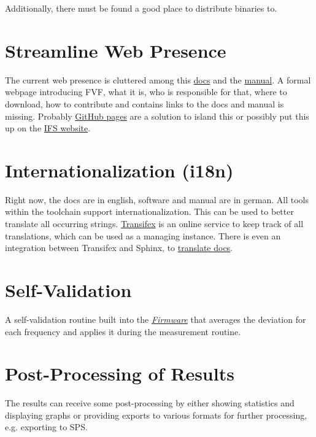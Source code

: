 Additionally, there must be found a good place to distribute binaries to.


\section{Streamline Web Presence}
\label{development/follow-ups:streamline-web-presence}
The current web presence is cluttered among this \href{https://fvf.readthedocs.org}{docs} and the \href{https://fvf-manual.readthedocs.org}{manual}. A formal webpage introducing FVF, what it is, who is responsible for that, where to download, how to contribute and contains links to the docs and manual is missing. Probably \href{https://pages.github.com}{GitHub pages} are a solution to island this or possibly put this up on the \href{http://www.sport.tu-darmstadt.de}{IFS website}.


\section{Internationalization (i18n)}
\label{development/follow-ups:internationalization-i18n}\label{development/follow-ups:ifs-website}
Right now, the docs are in english, software and manual are in german. All tools within the toolchain support internationalization. This can be used to better translate all occurring strings. \href{https://www.transifex.com}{Transifex} is an online service to keep track of all translations, which can be used as a managing instance. There is even an integration between Transifex and Sphinx, to \href{http://sphinx-doc.org/intl.html}{translate docs}.


\section{Self-Validation}
\label{development/follow-ups:self-validation}\label{development/follow-ups:translate-docs}
A self-validation routine built into the {\hyperref[source/firmware::doc]{\emph{\emph{Firmware}}}} that averages the deviation for each frequency and applies it during the measurement routine.


\section{Post-Processing of Results}
\label{development/follow-ups:post-processing-of-results}
The results can receive some post-processing by either showing statistics and displaying graphs or providing exports to various formats for further processing, e.g. exporting to SPS.


